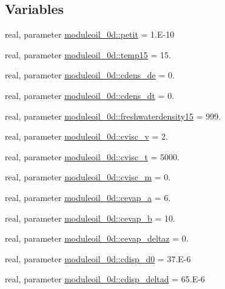 \subsection*{Variables}
\begin{DoxyCompactItemize}
\item 
real, parameter \mbox{\hyperlink{namespacemoduleoil__0d_a547127552891b3c14b9a17bb1f717386}{moduleoil\+\_\+0d\+::petit}} = 1.\+E-\/10
\item 
real, parameter \mbox{\hyperlink{namespacemoduleoil__0d_abf4265993041d7eaab8c8c078c27e3b4}{moduleoil\+\_\+0d\+::temp15}} = 15.
\item 
real, parameter \mbox{\hyperlink{namespacemoduleoil__0d_aa8e32147ad54c70f37e2e8b127e6e145}{moduleoil\+\_\+0d\+::cdens\+\_\+de}} = 0.
\item 
real, parameter \mbox{\hyperlink{namespacemoduleoil__0d_a02c6c26069ce4f0c05a7b9b59479fb2b}{moduleoil\+\_\+0d\+::cdens\+\_\+dt}} = 0.
\item 
real, parameter \mbox{\hyperlink{namespacemoduleoil__0d_a0433cc793bc0b14d9eca3691e04c30e7}{moduleoil\+\_\+0d\+::freshwaterdensity15}} = 999.
\item 
real, parameter \mbox{\hyperlink{namespacemoduleoil__0d_acfacd3adca2fee1b77701377a603ecff}{moduleoil\+\_\+0d\+::cvisc\+\_\+v}} = 2.
\item 
real, parameter \mbox{\hyperlink{namespacemoduleoil__0d_a76d0bac579178545a0803fac44896e05}{moduleoil\+\_\+0d\+::cvisc\+\_\+t}} = 5000.
\item 
real, parameter \mbox{\hyperlink{namespacemoduleoil__0d_a5d1220b3aab88a0e344bb8c0fffd71a3}{moduleoil\+\_\+0d\+::cvisc\+\_\+m}} = 0.
\item 
real, parameter \mbox{\hyperlink{namespacemoduleoil__0d_abe2021f4baaab1a74a16f3d57bb50a11}{moduleoil\+\_\+0d\+::cevap\+\_\+a}} = 6.
\item 
real, parameter \mbox{\hyperlink{namespacemoduleoil__0d_aadd06c64182eb7a763a5e757ff385c25}{moduleoil\+\_\+0d\+::cevap\+\_\+b}} = 10.
\item 
real, parameter \mbox{\hyperlink{namespacemoduleoil__0d_a31c60df762b057d952f871b7b2c116fa}{moduleoil\+\_\+0d\+::cevap\+\_\+deltaz}} = 0.
\item 
real, parameter \mbox{\hyperlink{namespacemoduleoil__0d_ae1d966eb0d636236bb46e1077d70e0f4}{moduleoil\+\_\+0d\+::cdisp\+\_\+d0}} = 37.\+E-\/6
\item 
real, parameter \mbox{\hyperlink{namespacemoduleoil__0d_a37051aa74023c2eb92aa1703a387949f}{moduleoil\+\_\+0d\+::cdisp\+\_\+deltad}} = 65.\+E-\/6

\end{DoxyCompactItemize}
